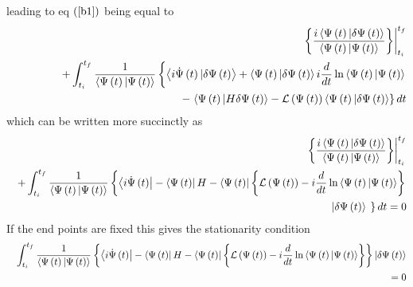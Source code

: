 \documentclass[aps,preprint]{revtex4}
\begin{document}
leading to eq $\left( \ref{b1}\right) $ being equal to%
\begin{eqnarray}
&&\left. \left\{ \frac{i\left\langle \Psi \left( t\right) |\delta \Psi
\left( t\right) \right\rangle }{\left\langle \Psi \left( t\right) |\Psi
\left( t\right) \right\rangle }\right\} \right\vert _{t_{i}}^{t_{f}}  \notag
\\
&&\qquad \qquad +\int_{t_{i}}^{t_{f}}\frac{1}{\left\langle \Psi \left(
t\right) |\Psi \left( t\right) \right\rangle }\left\{ \left\langle i\dot{\Psi%
}\left( t\right) |\delta \Psi \left( t\right) \right\rangle +\left\langle
\Psi \left( t\right) |\delta \Psi \left( t\right) \right\rangle i\frac{d}{dt}%
\ln \left\langle \Psi \left( t\right) |\Psi \left( t\right) \right\rangle
\right.  \notag \\
&&\qquad \qquad \qquad \qquad \qquad \qquad \qquad -\left. \left\langle \Psi
\left( t\right) |H\delta \Psi \left( t\right) \right\rangle -\mathcal{L}%
\left( \Psi \left( t\right) \right) \left\langle \Psi \left( t\right)
|\delta \Psi \left( t\right) \right\rangle \right\} dt
\end{eqnarray}%
which can be written more succinctly as 
\begin{eqnarray}
&&\left. \left\{ \frac{i\left\langle \Psi \left( t\right) |\delta \Psi
\left( t\right) \right\rangle }{\left\langle \Psi \left( t\right) |\Psi
\left( t\right) \right\rangle }\right\} \right\vert _{t_{i}}^{t_{f}}  \notag
\\
&&+\int_{t_{i}}^{t_{f}}\frac{1}{\left\langle \Psi \left( t\right) |\Psi
\left( t\right) \right\rangle }\left\{ \left\langle i\dot{\Psi}\left(
t\right) \right\vert -\left\langle \Psi \left( t\right) \right\vert
H-\left\langle \Psi \left( t\right) \right\vert \left\{ \mathcal{L}\left(
\Psi \left( t\right) \right) -i\frac{d}{dt}\ln \left\langle \Psi \left(
t\right) |\Psi \left( t\right) \right\rangle \right\} \right.  \notag \\
&&\qquad \qquad \qquad \qquad \qquad \qquad \qquad \qquad \qquad \qquad
\qquad \qquad \qquad \left. \left\vert \delta \Psi \left( t\right)
\right\rangle \overset{}{\left. {}\right. }\right\} dt=0
\end{eqnarray}%
If the end points are fixed this gives the stationarity condition 
\begin{eqnarray}
&&\int_{t_{i}}^{t_{f}}\frac{1}{\left\langle \Psi \left( t\right) |\Psi
\left( t\right) \right\rangle }\left\{ \left\langle i\dot{\Psi}\left(
t\right) \right\vert -\left\langle \Psi \left( t\right) \right\vert
H-\left\langle \Psi \left( t\right) \right\vert \left\{ \mathcal{L}\left(
\Psi \left( t\right) \right) -i\frac{d}{dt}\ln \left\langle \Psi \left(
t\right) |\Psi \left( t\right) \right\rangle \right\} \right\} \left\vert
\delta \Psi \left( t\right) \right\rangle  \notag \\
&&\qquad \qquad \qquad \qquad \qquad \qquad \qquad \qquad \qquad \qquad
\qquad \qquad \qquad \qquad \qquad \qquad \qquad =0
\end{eqnarray}%
\end{document}
